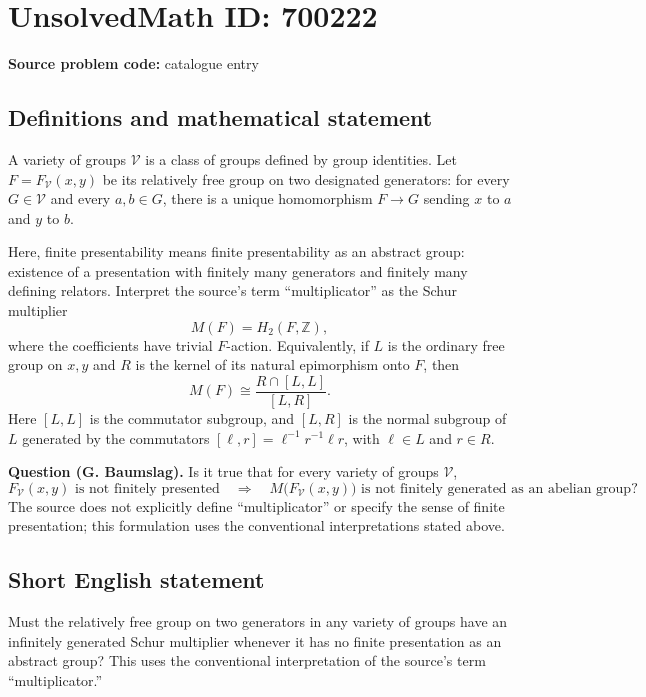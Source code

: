 \documentclass[11pt]{article}
\newcommand{\Z}{\mathbb{Z}}
\begin{document}
\section*{UnsolvedMath ID: 700222}
\textbf{Source problem code:} catalogue entry
\subsection{Definitions and mathematical statement}
A variety of groups \(\mathcal V\) is a class of groups defined by group identities. Let \(F=F_{\mathcal V}(x,y)\) be its relatively free group on two designated generators: for every \(G\in\mathcal V\) and every \(a,b\in G\), there is a unique homomorphism \(F\to G\) sending \(x\) to \(a\) and \(y\) to \(b\).

Here, finite presentability means finite presentability as an abstract group: existence of a presentation with finitely many generators and finitely many defining relators. Interpret the source's term ``multiplicator'' as the Schur multiplier
\[
M(F)=H_2(F,\Z),
\]
where the coefficients have trivial \(F\)-action. Equivalently, if \(L\) is the ordinary free group on \(x,y\) and \(R\) is the kernel of its natural epimorphism onto \(F\), then
\[
M(F)\cong \frac{R\cap[L,L]}{[L,R]}.
\]
Here \([L,L]\) is the commutator subgroup, and \([L,R]\) is the normal subgroup of \(L\) generated by the commutators \([\ell,r]=\ell^{-1}r^{-1}\ell r\), with \(\ell\in L\) and \(r\in R\).

\textbf{Question (G. Baumslag).} Is it true that for every variety of groups \(\mathcal V\),
\[
F_{\mathcal V}(x,y)\text{ is not finitely presented}
\quad\Longrightarrow\quad
M\bigl(F_{\mathcal V}(x,y)\bigr)\text{ is not finitely generated as an abelian group}?
\]
The source does not explicitly define ``multiplicator'' or specify the sense of finite presentation; this formulation uses the conventional interpretations stated above.
\subsection{Short English statement}
Must the relatively free group on two generators in any variety of groups have an infinitely generated Schur multiplier whenever it has no finite presentation as an abstract group? This uses the conventional interpretation of the source's term ``multiplicator.''
\end{document}
